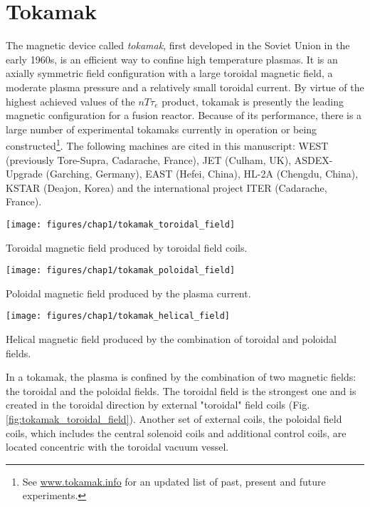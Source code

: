 \section{Tokamak}
The magnetic device called \emph{tokamak}, first developed in the Soviet Union in the early 1960s, is an efficient way to confine high temperature plasmas. It is an axially symmetric field configuration with a large toroidal magnetic field, a moderate plasma pressure and a relatively small toroidal current. By virtue of the highest achieved values of the $n T \tau_e$ product, tokamak is presently the leading magnetic configuration for a fusion reactor. Because of its performance, there is a large number of experimental tokamaks currently in operation or being constructed\footnote{See \href{http://www.tokamak.info/}{www.tokamak.info} for an updated list of past, present and future experiments.}. The following machines are cited in this manuscript: WEST (previously Tore-Supra, Cadarache, France), JET (Culham, UK), ASDEX-Upgrade (Garching, Germany), EAST (Hefei, China), HL-2A (Chengdu, China), KSTAR (Deajon, Korea) and the international project ITER (Cadarache, France).

\begin{marginfigure}
	\texttt{[image: figures/chap1/tokamak\_toroidal\_field]}
	\caption{Toroidal magnetic field produced by toroidal field coils.}
	\label{fig:tokamak_toroidal_field}
\end{marginfigure}

\begin{marginfigure}
	\texttt{[image: figures/chap1/tokamak\_poloidal\_field]}
	\caption{Poloidal magnetic field produced by the plasma current.}
	\label{fig:tokamak_poloidal_field}
\end{marginfigure}

\begin{marginfigure}
	\texttt{[image: figures/chap1/tokamak\_helical\_field]}
	\caption{Helical magnetic field produced by the combination of toroidal and poloidal fields.}
	\label{fig:tokamak_helical_field}
\end{marginfigure}

In a tokamak, the plasma is confined by the combination of two magnetic fields: the toroidal and the poloidal fields. The toroidal field is the strongest one and is created in the toroidal direction by external "toroidal" field coils (Fig.\ref{fig:tokamak_toroidal_field}). Another set  of  external  coils, the poloidal field coils, which includes the central solenoid coils and additional control coils, are located concentric with the toroidal vacuum vessel.

